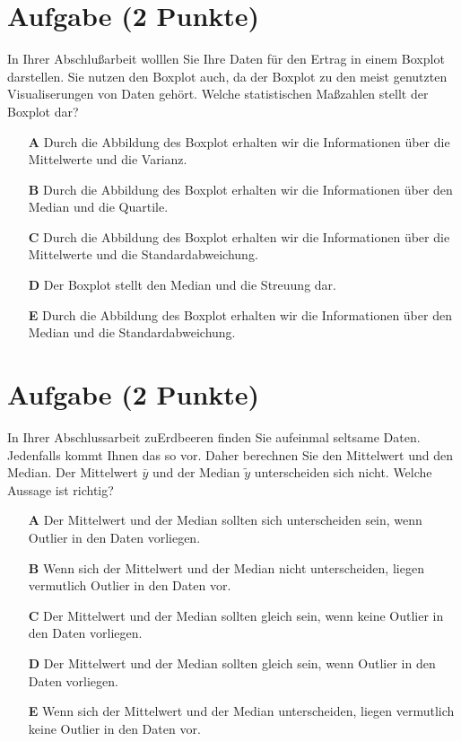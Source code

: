 \documentclass[a4paper, 9pt]{scrartcl}\usepackage[]{graphicx}\usepackage[]{xcolor}
\begin{document}
\section{Aufgabe \hfill (2 Punkte)}



In Ihrer Abschlußarbeit wolllen Sie Ihre Daten für den Ertrag in einem Boxplot darstellen. Sie nutzen den Boxplot auch, da der Boxplot zu den meist genutzten Visualiserungen von Daten gehört. Welche statistischen Maßzahlen stellt der Boxplot dar?

 



\begin{enumerate}
\item [\textbf{A} \msquare] Durch die Abbildung des Boxplot erhalten wir die Informationen über die Mittelwerte und die Varianz.
\item [\textbf{B} \msquare] Durch die Abbildung des Boxplot erhalten wir die Informationen über den Median und die Quartile.
\item [\textbf{C} \msquare] Durch die Abbildung des Boxplot erhalten wir die Informationen über die Mittelwerte und die Standardabweichung.
\item [\textbf{D} \msquare] Der Boxplot stellt den Median und die Streuung dar.
\item [\textbf{E} \msquare] Durch die Abbildung des Boxplot erhalten wir die Informationen über den Median und die Standardabweichung.
\end{enumerate}

\section{Aufgabe \hfill (2 Punkte)}



In Ihrer Abschlussarbeit zuErdbeeren finden Sie aufeinmal seltsame Daten. Jedenfalls kommt Ihnen das so vor. Daher berechnen Sie den Mittelwert und den Median. Der Mittelwert $\bar{y}$ und der Median $\tilde{y}$ unterscheiden sich nicht. Welche Aussage ist richtig?



\begin{enumerate}
\item [\textbf{A} \msquare] Der Mittelwert und der Median sollten sich unterscheiden sein, wenn Outlier in den Daten vorliegen. 
\item [\textbf{B} \msquare] Wenn sich der Mittelwert und der Median nicht unterscheiden, liegen vermutlich Outlier in den Daten vor.
\item [\textbf{C} \msquare] Der Mittelwert und der Median sollten gleich sein, wenn keine Outlier in den Daten vorliegen. 
\item [\textbf{D} \msquare] Der Mittelwert und der Median sollten gleich sein, wenn Outlier in den Daten vorliegen. 
\item [\textbf{E} \msquare] Wenn sich der Mittelwert und der Median unterscheiden, liegen vermutlich keine Outlier in den Daten vor.
\end{enumerate}
\end{document}
